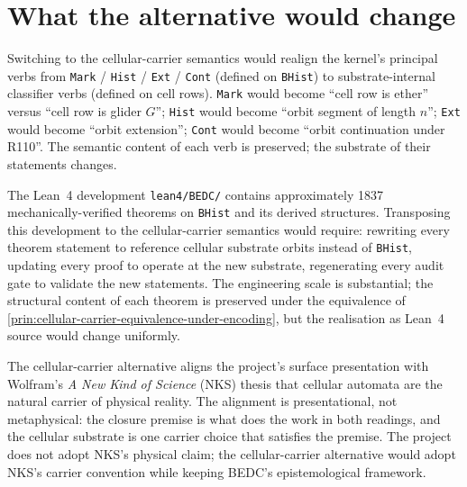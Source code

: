 \section{What the alternative would change}
\label{sec:cellular-carrier-what-would-change}

\begin{remark}
\label{rem:cellular-carrier-kernel-verb-realignment}
Switching to the cellular-carrier semantics would realign the kernel's principal verbs from \texttt{Mark} / \texttt{Hist} / \texttt{Ext} / \texttt{Cont} (defined on \texttt{BHist}) to substrate-internal classifier verbs (defined on cell rows). \texttt{Mark} would become ``cell row is ether'' versus ``cell row is glider $G$''; \texttt{Hist} would become ``orbit segment of length $n$''; \texttt{Ext} would become ``orbit extension''; \texttt{Cont} would become ``orbit continuation under R110''. The semantic content of each verb is preserved; the substrate of their statements changes.
\end{remark}

\begin{remark}
\label{rem:cellular-carrier-library-transposition-cost}
The Lean~4 development \texttt{lean4/BEDC/} contains approximately 1837 mechanically-verified theorems on \texttt{BHist} and its derived structures. Transposing this development to the cellular-carrier semantics would require: rewriting every theorem statement to reference cellular substrate orbits instead of \texttt{BHist}, updating every proof to operate at the new substrate, regenerating every audit gate to validate the new statements. The engineering scale is substantial; the structural content of each theorem is preserved under the equivalence of \autoref{prin:cellular-carrier-equivalence-under-encoding}, but the realisation as Lean~4 source would change uniformly.
\end{remark}

\begin{remark}
\label{rem:cellular-carrier-aliasing-nks}
The cellular-carrier alternative aligns the project's surface presentation with Wolfram's \emph{A New Kind of Science} (NKS) thesis that cellular automata are the natural carrier of physical reality. The alignment is presentational, not metaphysical: the closure premise is what does the work in both readings, and the cellular substrate is one carrier choice that satisfies the premise. The project does not adopt NKS's physical claim; the cellular-carrier alternative would adopt NKS's carrier convention while keeping BEDC's epistemological framework.
\end{remark}

